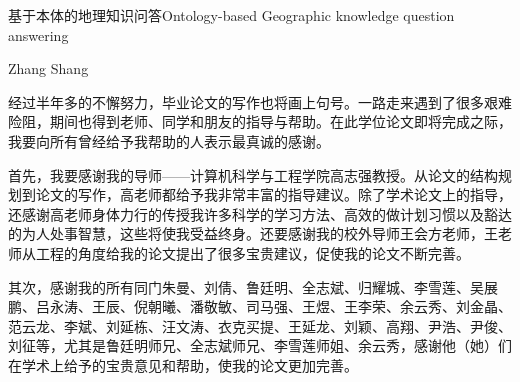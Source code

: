 \documentclass[nomlist,masters,openany]{seuthesix}
\begin{document}
\title{\quad}{基于本体的地理知识问答}{\quad}{Ontology-based Geographic knowledge question answering}
\author{张赏}{Zhang Shang}
\authorizedate{}
\committeechair{}
\reviewer{}{}
\makebigcover
\makecover


\tableofcontents
\listofothers

\mainmatter







%



\acknowledgement
经过半年多的不懈努力，毕业论文的写作也将画上句号。一路走来遇到了很多艰难险阻，期间也得到老师、同学和朋友的指导与帮助。在此学位论文即将完成之际，我要向所有曾经给予我帮助的人表示最真诚的感谢。

首先，我要感谢我的导师——计算机科学与工程学院高志强教授。从论文的结构规划到论文的写作，高老师都给予我非常丰富的指导建议。除了学术论文上的指导，还感谢高老师身体力行的传授我许多科学的学习方法、高效的做计划习惯以及豁达的为人处事智慧，这些将使我受益终身。还要感谢我的校外导师王会方老师，王老师从工程的角度给我的论文提出了很多宝贵建议，促使我的论文不断完善。

其次，感谢我的所有同门朱曼、刘倩、鲁廷明、全志斌、归耀城、李雪莲、吴展鹏、吕永涛、王辰、倪朝曦、潘敬敏、司马强、王煜、王李荣、余云秀、刘金晶、范云龙、李斌、刘延栋、汪文涛、衣克买提、王延龙、刘颖、高翔、尹浩、尹俊、刘征等，尤其是鲁廷明师兄、全志斌师兄、李雪莲师姐、余云秀，感谢他（她）们在学术上给予的宝贵意见和帮助，使我的论文更加完善。
\end{document}
